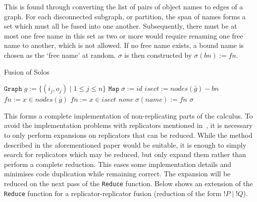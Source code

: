         This is found through converting the list of pairs of object names to edges of a graph.
        For each disconnected subgraph, or partition, the span of names forms a set which must all be fused into one another.
        Subsequently, there must be at most one free name in this set as two or more would require renaming one free name to another, which is not allowed.
        If no free name exists, a bound name is chosen as the `free name' at random.
        $\sigma$ is then constructed by $\sigma(bn) := fn$.

        \begin{breakablealgorithm}
            \caption{Fusion of Solos}
            \begin{algorithmic}[1]
                    \State$\texttt{Graph} \; g := \{(i_j, o_j) \; | \; 1 \leq j \leq n\}$
                    \State$\texttt{Map} \; \sigma := id$
                        \State$isect := nodes(\bar{g}) - bn$
                            \State$fn := x \in nodes(\bar{g})$
                            \State$fn := x \in isect$
                        \Else
                            \State\Return\textit{none}
                        \EndIf
                            \State$\sigma(name) := fn$
                        \EndFor
                    \EndFor
                    \State\Return$\sigma$
                \EndFunction
            \end{algorithmic}
        \end{breakablealgorithm}

        This forms a complete implementation of non-replicating parts of the calculus.
        To avoid the implementation problems with replicators mentioned in~\cite{solo-diagrams}, it is necessary to only perform expansions on replicators that can be reduced.
        While the method described in the aforementioned paper would be suitable, it is enough to simply search for replicators which may be reduced, but only expand them rather than perform a complete reduction.
        This eases some implementation details and minimises code duplication while remaining correct.
        The expansion will be reduced on the next pass of the \texttt{Reduce} function.
        Below shows an extension of the \texttt{Reduce} function for a replicator-replicator fusion (reduction of the form $!P \;|\; !Q$).

